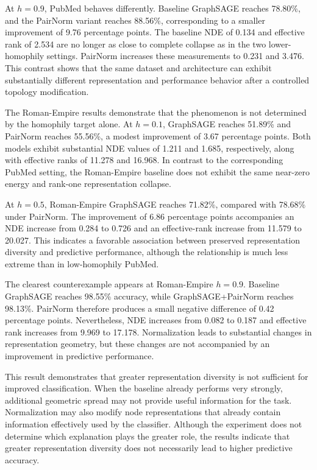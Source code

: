\documentclass[english]{lni}
\begin{document}
 At $h=0.9$, PubMed behaves differently. Baseline GraphSAGE reaches 78.80\%, and the PairNorm variant reaches 88.56\%, corresponding to a smaller improvement of 9.76 percentage points. The baseline NDE of 0.134 and effective rank of 2.534 are no longer as close to complete collapse as in the two lower-homophily settings. PairNorm increases these measurements to 0.231 and 3.476. This contrast shows that the same dataset and architecture can exhibit substantially different representation and performance behavior after a controlled topology modification.

The Roman-Empire results demonstrate that the phenomenon is not determined by the homophily target alone. At $h=0.1$, GraphSAGE reaches 51.89\% and PairNorm reaches 55.56\%, a modest improvement of 3.67 percentage points. Both models exhibit substantial NDE values of 1.211 and 1.685, respectively, along with effective ranks of 11.278 and 16.968. In contrast to the corresponding PubMed setting, the Roman-Empire baseline does not exhibit the same near-zero energy and rank-one representation collapse.

At $h=0.5$, Roman-Empire GraphSAGE reaches 71.82\%, compared with 78.68\% under PairNorm. The improvement of 6.86 percentage points accompanies an NDE increase from 0.284 to 0.726 and an effective-rank increase from 11.579 to 20.027. This indicates a favorable association between preserved representation diversity and predictive performance, although the relationship is much less extreme than in low-homophily PubMed.

The clearest counterexample appears at Roman-Empire $h=0.9$. Baseline GraphSAGE reaches 98.55\% accuracy, while GraphSAGE+PairNorm reaches 98.13\%. PairNorm therefore produces a small negative difference of 0.42 percentage points. Nevertheless, NDE increases from 0.082 to 0.187 and effective rank increases from 9.969 to 17.178. Normalization leads to substantial changes in representation geometry, but these changes are not accompanied by an improvement in predictive performance.

This result demonstrates that greater representation diversity is not sufficient for improved classification. When the baseline already performs very strongly, additional geometric spread may not provide useful information for the task. Normalization may also modify node representations that already contain information effectively used by the classifier. Although the experiment does not determine which explanation plays the greater role, the results indicate that greater representation diversity does not necessarily lead to higher predictive accuracy.
\end{document}
